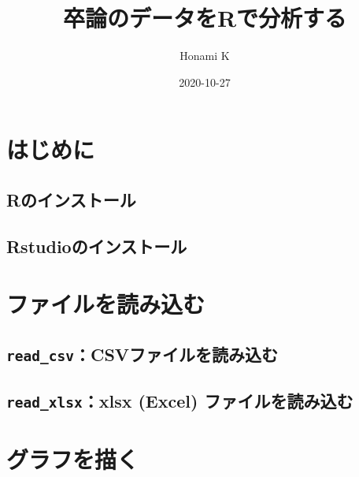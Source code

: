 \documentclass[
]{book}
\title{卒論のデータをRで分析する}
\author{Honami K}
\date{2020-10-27}
\begin{document}
\maketitle

{
\setcounter{tocdepth}{1}
\tableofcontents
}
\hypertarget{ux306fux3058ux3081ux306b}{%
\chapter{はじめに}\label{ux306fux3058ux3081ux306b}}

\hypertarget{rux306eux30a4ux30f3ux30b9ux30c8ux30fcux30eb}{%
\section{Rのインストール}\label{rux306eux30a4ux30f3ux30b9ux30c8ux30fcux30eb}}

\hypertarget{rstudioux306eux30a4ux30f3ux30b9ux30c8ux30fcux30eb}{%
\section{Rstudioのインストール}\label{rstudioux306eux30a4ux30f3ux30b9ux30c8ux30fcux30eb}}

\hypertarget{files}{%
\chapter{ファイルを読み込む}\label{files}}

\hypertarget{read_csvcsvux30d5ux30a1ux30a4ux30ebux3092ux8aadux307fux8fbcux3080}{%
\section{\texorpdfstring{\texttt{read\_csv}：CSVファイルを読み込む}{read\_csv：CSVファイルを読み込む}}\label{read_csvcsvux30d5ux30a1ux30a4ux30ebux3092ux8aadux307fux8fbcux3080}}

\hypertarget{read_xlsxxlsx-excel-ux30d5ux30a1ux30a4ux30ebux3092ux8aadux307fux8fbcux3080}{%
\section{\texorpdfstring{\texttt{read\_xlsx}：xlsx (Excel) ファイルを読み込む}{read\_xlsx：xlsx (Excel) ファイルを読み込む}}\label{read_xlsxxlsx-excel-ux30d5ux30a1ux30a4ux30ebux3092ux8aadux307fux8fbcux3080}}

\hypertarget{ux30b0ux30e9ux30d5ux3092ux63cfux304f}{%
\chapter{グラフを描く}\label{ux30b0ux30e9ux30d5ux3092ux63cfux304f}}
\end{document}
